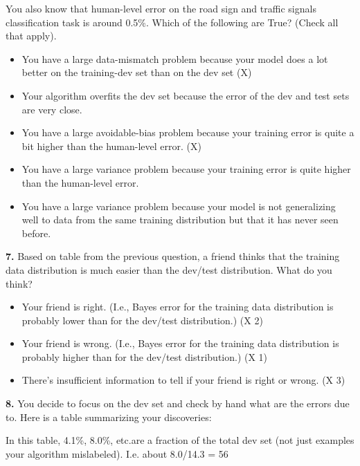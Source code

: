 You also know that human-level error on the road sign and traffic signals classification task is around 0.5\%. Which of the following are True? (Check all that apply).
\begin{itemize}
    \item You have a large data-mismatch problem because your model does a lot better on the training-dev set than on the dev set (X)
    \item Your algorithm overfits the dev set because the error of the dev and test sets are very close.
    \item You have a large avoidable-bias problem because your training error is quite a bit higher than the human-level error. (X)
    \item You have a large variance problem because your training error is quite higher than the human-level error.
    \item You have a large variance problem because your model is not generalizing well to data from the same training distribution but that it has never seen before.
\end{itemize}
\textbf{7.} Based on table from the previous question, a friend thinks that the training data distribution is much easier than the dev/test distribution. What do you think?
\begin{itemize}
    \item Your friend is right. (I.e., Bayes error for the training data distribution is probably lower than for the dev/test distribution.) (X 2)
    \item Your friend is wrong. (I.e., Bayes error for the training data distribution is probably higher than for the dev/test distribution.) (X 1)
    \item There’s insufficient information to tell if your friend is right or wrong. (X 3)
\end{itemize}
\textbf{8.} You decide to focus on the dev set and check by hand what are the errors due to. Here is a table summarizing your discoveries:

In this table, 4.1\%, 8.0\%, etc.are a fraction of the total dev set (not just examples your algorithm mislabeled). I.e. about 8.0/14.3 = 56%

